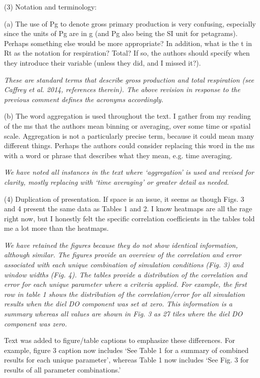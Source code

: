 \documentclass[letterpaper,12pt]{article}\usepackage[]{graphicx}\usepackage[]{color}
\begin{document}
(3) Notation and terminology:

(a) The use of Pg to denote gross primary production is very confusing, especially since the units of Pg are in g (and Pg also being the SI unit for petagrams). Perhaps something else would be more appropriate? In addition, what is the t in Rt as the notation for respiration? Total? If so, the authors should specify when they introduce their variable (unless they did, and I missed it?).

{\it These are standard terms that describe gross production and total respiration (see Caffrey et al. 2014, references therein).  The above revision in response to the previous comment defines the acronyms accordingly.}

(b) The word aggregation is used throughout the text. I gather from my reading of the ms that the authors mean binning or averaging, over some time or spatial scale. Aggregation is not a particularly precise term, because it could mean many different things. Perhaps the authors could consider replacing this word in the ms with a word or phrase that describes what they mean, e.g. time averaging.

{\it We have noted all instances in the text where `aggregation' is used and revised for clarity, mostly replacing with `time averaging' or greater detail as needed.}

(4) Duplication of presentation. If space is an issue, it seems as though Figs. 3 and 4 present the same data as Tables 1 and 2. I know heatmaps are all the rage right now, but I honestly felt the specific correlation coefficients in the tables told me a lot more than the heatmaps.

{\it We have retained the figures because they do not show identical information, although similar.  The figures provide an overview of the correlation and error associated with each unique combination of simulation conditions (Fig. 3) and window widths (Fig. 4).  The tables provide a distribution of the correlation and error for each unique parameter where a criteria applied.  For example, the first row in table 1 shows the distribution of the correlation/error for all simulation results when the diel DO component was set at zero.  This information is a summary whereas all values are shown in Fig. 3 as 27 tiles where the diel DO component was zero.

Text was added to figure/table captions to emphasize these differences.  For example, figure 3 caption now includes `See Table 1 for a summary of combined results for each unique parameter', whereas Table 1 now includes `See Fig. 3 for results of all parameter combinations.'
}
\end{document}
